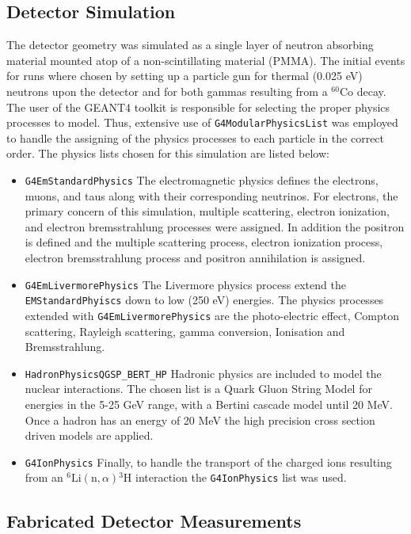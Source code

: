\documentclass{anstrans}
\newcommand{\iso}[2]{${}^{#2}${#1}}
\begin{document}
\subsection{Detector Simulation}
The detector geometry was simulated as a single layer of neutron absorbing material mounted atop of a non-scintillating material (PMMA).
The initial events for runs where chosen by setting up a particle gun for thermal (0.025 eV) neutrons upon the detector and for both gammas resulting from a \iso{Co}{60} decay.
The user of the GEANT4 toolkit is responsible for selecting the proper physics processes to model.
Thus, extensive use of \verb+G4ModularPhysicsList+ was employed to handle the assigning of the physics processes to each particle in the correct order.
The physics lists chosen for this simulation are listed below:
\begin{itemize}
    \item \verb+G4EmStandardPhysics+ The electromagnetic physics defines the electrons, muons, and taus along with their corresponding neutrinos. For electrons, the primary concern of this simulation, multiple scattering, electron ionization, and electron bremsstrahlung processes were assigned.  In addition the positron is defined and the multiple scattering process, electron ionization process, electron bremsstrahlung process and positron annihilation is assigned.
    \item \verb+G4EmLivermorePhysics+ The Livermore physics process extend the \verb+EMStandardPhyiscs+ down to low (250 eV) energies. The physics processes extended with \verb+G4EmLivermorePhysics+ are the photo-electric effect, Compton scattering, Rayleigh scattering, gamma conversion, Ionisation and Bremsstrahlung. 
    \item \verb+HadronPhysicsQGSP_BERT_HP+  Hadronic physics are included to model the nuclear interactions. The chosen list is a Quark Gluon String Model for energies in the 5-25 GeV range, with a Bertini cascade model until 20 MeV.  Once a hadron has an energy of 20 MeV the high precision cross section driven models are applied.
    \item \verb+G4IonPhysics+ Finally, to handle the transport of the charged ions resulting from an ${}^6\text{Li}(\text{n},\alpha){}^{3}\text{H}$ interaction the \verb+G4IonPhysics+ list was used.
\end{itemize}


\subsection{Fabricated Detector Measurements}
\end{document}
